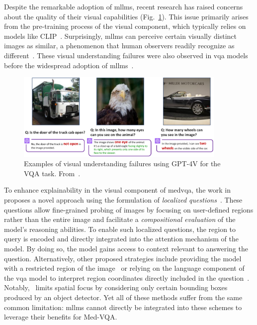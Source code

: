 Despite the remarkable adoption of \glspl{mllm}, recent research has raised concerns about the quality of their visual capabilities (Fig.~\ref{fig:locvqallm_examples_gpt_4v}). This issue primarily arises from the pre-training process of the visual component, which typically relies on models like CLIP~\cite{radford2021learning}. Surprisingly, \glspl{mllm} can perceive certain visually distinct images as similar, a phenomenon that human observers readily recognize as different~\cite{tong2024eyes}. These visual understanding failures were also observed in \gls{vqa} models before the widespread adoption of \glspl{mllm}~\cite{goyal2017making,hudson2019gqa,ribeiro2019red,selvaraju2020squinting}.
\begin{figure}[!h]
\begin{center}
\includegraphics[width=0.9\textwidth]{Figures/Part1_LocVQA/02_llm/examples_gpt_4v.png}
\caption{Examples of visual understanding failures using GPT-4V for the VQA task. From~\cite{tong2024eyes}.}
\label{fig:locvqallm_examples_gpt_4v}
\end{center}
\end{figure}

To enhance explainability in the visual component of \gls{medvqa}, the work in~\cite{tascon2023localized} proposes a novel approach using the formulation of \textit{localized questions}~\cite{tascon2023localized}. These questions allow fine-grained probing of images by focusing on user-defined regions rather than the entire image and facilitate a \textit{compositional evaluation} of the model's reasoning abilities.
To enable such localized questions, the region to query is encoded and directly integrated into the attention mechanism of the model. By doing so, the model gains access to context relevant to answering the question. Alternatively, other proposed strategies include providing the model with a restricted region of the image~\cite{tascon2022consistency} or relying on the language component of the \gls{vqa} model to interpret region coordinates directly included in the question~\cite{vu2020question}. Notably,~\cite{mani2020point} limits spatial focus by considering only certain bounding boxes produced by an object detector. Yet all of these methods suffer from the same common limitation: \glspl{mllm} cannot directly be integrated into these schemes to leverage their benefits for Med-VQA.

